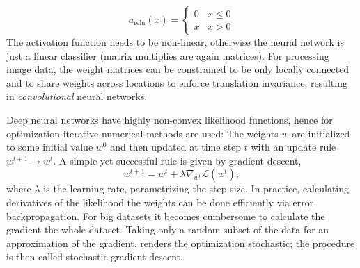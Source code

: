 		\begin{equation}
			a_{\textrm{relu}}(x)=
			\begin{cases}
			      0 & x\leq 0 \\
			      x & x > 0
			\end{cases}
		\end{equation}
		The activation function needs to be non-linear, otherwise the neural network is just a linear classifier (matrix multiplies are again matrices).
		For processing image data, the weight matrices can be constrained to be only locally connected and to share weights across locations to enforce translation invariance, resulting in \textit{convolutional} neural networks.

		Deep neural networks have highly non-convex likelihood functions, hence for optimization iterative numerical methods are used: The weights $w$ are initialized to some initial value $w^0$ 
		and then updated at time step $t$ with an update rule $w^{t+1}\rightarrow w^t$.
		A simple yet successful rule is given by gradient descent,
		\begin{equation}
			w^{t+1} = w^{t} + \lambda \nabla_{w^t}	 \mathcal{L} (w^t),
		\end{equation}
		where $\lambda$ is the learning rate, parametrizing the step size. In practice, calculating derivatives of the likelihood \wrt the weights can be done efficiently via error backpropagation.
		For big datasets it becomes cumbersome to calculate the gradient \wrt the whole dataset. Taking only a random subset of the data for an approximation of the gradient, renders the optimization stochastic; the procedure is then called stochastic gradient descent.


\newpage
